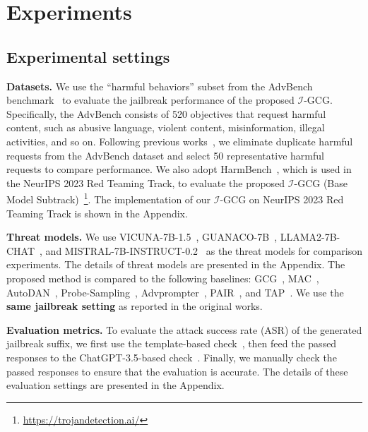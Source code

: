 \section{Experiments}

\subsection{Experimental settings}
\label{sec:Experiments Setting}
\par \textbf{Datasets.}  We use the ``harmful behaviors'' subset from the AdvBench benchmark~\cite{zou2023universal} to evaluate the jailbreak performance of the proposed $\mathcal{I}$-GCG. Specifically, the AdvBench consists of 520 objectives that request harmful content, such as abusive language, violent content, misinformation, illegal activities, and so on. Following previous works~\cite{chao2023jailbreaking,li2023deepinception,wei2024jailbroken}, we eliminate duplicate harmful requests from the AdvBench dataset and select 50 representative harmful requests to compare performance. We also adopt HarmBench~\cite{mazeika2024harmbench}, which is used in the NeurIPS 2023 Red Teaming Track, to evaluate the proposed $\mathcal{I}$-GCG (Base Model Subtrack)~\footnote{\url{https://trojandetection.ai/}}. The implementation of our $\mathcal{I}$-GCG on NeurIPS 2023 Red Teaming Track is shown in the Appendix. 



\par \textbf{Threat models.}
We use VICUNA-7B-1.5~\cite{vicuna2023}, GUANACO-7B~\cite{dettmers2024qlora}, LLAMA2-7B-CHAT~\cite{touvron2023llama}, and MISTRAL-7B-INSTRUCT-0.2~\cite{jiang2023mistral} as the threat models for comparison experiments. The details of threat models are presented in the Appendix. The proposed method is compared to the following baselines: GCG~\cite{zou2023universal}, MAC~\cite{zhang2024boosting}, AutoDAN~\cite{liu2023autodan}, Probe-Sampling~\cite{zhao2024accelerating}, Advprompter~\cite{paulus2024advprompter}, PAIR~\cite{chao2023jailbreaking}, and TAP~\cite{mehrotra2023tree}. We use the \textbf{same jailbreak setting} as reported in the original works.

\par \textbf{Evaluation metrics.} To evaluate the attack success rate (ASR) of the generated jailbreak suffix, we first use the template-based check~\cite{zou2023universal,chen2024red,liu2023autodan}, then feed the passed responses to the ChatGPT-3.5-based check~\cite{chao2023jailbreaking,chen2024red,tdc2023}. Finally, we manually check the passed responses to ensure that the evaluation is accurate. The details of these evaluation settings are presented in the Appendix. 

